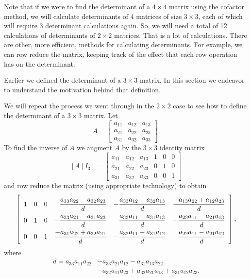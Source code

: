 Note that if we were to find the determinant of a $4\times 4$ matrix using the cofactor method, we will calculate determinants of 4 matrices of size $3\times 3$, each of which will require 3 determinant calculations again. So, we will need a total of 12 calculations of determinants of $2\times 2$ matrices. That is a lot of calculations. There are other, more efficient, methods for calculating determinants. For example, we can row reduce the matrix, keeping track of the effect that each row operation has on the determinant. 



\label{sec:det_3by3}

Earlier we defined the determinant of a $3 \times 3$ matrix. In this section we endeavor to understand the motivation behind that definition.

We will repeat the process we went through in the $2 \times 2$ case to see how to define the determinant of a $3 \times 3$  matrix. Let
\[A =  \left[ \begin {array}{ccc} a_{11}&a_{12}&a_{13} \\ a_{21}&a_{22}&a_{23}\\ a_{31}&a_{32}&a_{33}\end {array} \right].\]
To find the inverse of $A$ we augment $A$ by the $3 \times 3$ identity matrix 
\[[A \ | \ I_3] = \left[ \begin {array}{cccccc} a_{11}&a_{12}&a_{13}&1&0&0 \\ a_{21}&a_{22}&a_{23}&0&1&0 \\ a_{31}&a_{32}&a_{33}&0&0&1 \end {array} \right]\]
and row reduce the matrix (using appropriate technology) to obtain
\[\renewcommand{\arraystretch}{2.0}  \left[ \begin{array}{rrrrrr} 1&0&0&\ds \frac{a_{33}a_{22}-a_{32}a_{23}}{d}& \ds -\frac{a_{33}a_{12}-a_{32}a_{13}}{d}& \ds \frac{-a_{13}a_{22}+a_{12}a_{23}}{d} \\ 0&1&0& \ds -\frac{a_{33}a_{21}-a_{31}a_{23}}{d}& \ds \frac{a_{33}a_{11}-a_{31}a_{13}}{d}& \ds -\frac{a_{23}a_{11}-a_{21}a_{13}}{d} \\
0&0&1& \ds \frac{-a_{31}a_{22}+a_{32}a_{21}}{d}& \ds -\frac{a_{32}a_{11}-a_{31}a_{12}}{d}& \ds \frac{a_{22}a_{11}-a_{21}a_{12}}{d} \end{array} \right],\]
where 
\begin{equation} \label{eq:4_a_3by3_det}
\begin{aligned}
d = a_{33}a_{11}a_{22}&-a_{33}a_{21}a_{12}-a_{31}a_{13}a_{22} \\
	&-a_{32}a_{11}a_{23}+a_{32}a_{21}a_{13}+a_{31}a_{12}a_{23}.
\end{aligned}
\end{equation}

